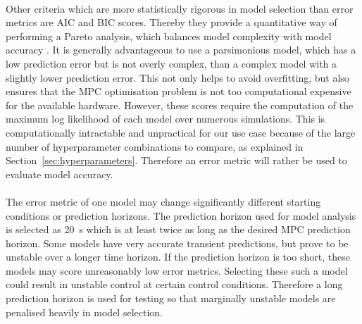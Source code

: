         \paragraph{}
        Other criteria which are more statistically rigorous in model selection 
        than error metrics are AIC and BIC scores.
        Thereby they provide a quantitative way of performing a Pareto analysis, 
        which balances model complexity with model accuracy \cite{Mangan2017}.
        It is generally advantageous to use a parsimonious model, 
        which has a low prediction error but is not overly complex, 
        than a complex model with a slightly lower prediction error.
        This not only helps to avoid overfitting, but also ensures that the MPC optimisation problem 
        is not too computational expensive for the available hardware.
        However, these scores require the computation of the maximum log likelihood of each model 
        over numerous simulations.
        This is computationally intractable and unpractical for our use case 
        because of the large number of hyperparameter combinations to compare, 
        as explained in Section~\ref{sec:hyperparameters}.
        Therefore an error metric will rather be used to evaluate model accuracy.
        

        \paragraph{}
        The error metric of one model may change significantly 
        different starting conditions or prediction horizons.
        The prediction horizon used for model analysis is selected as \SI{20}{\second}
        which is at least twice as long as the desired MPC prediction horizon.
        Some models have very accurate transient predictions, but prove to be unstable over a longer time horizon.
        If the prediction horizon is too short, these models may score unreasonably low error metrics.
        Selecting these such a model could result in unstable control at certain control conditions.
        Therefore a long prediction horizon is used for testing so that marginally unstable models 
        are penalised heavily in model selection. 

